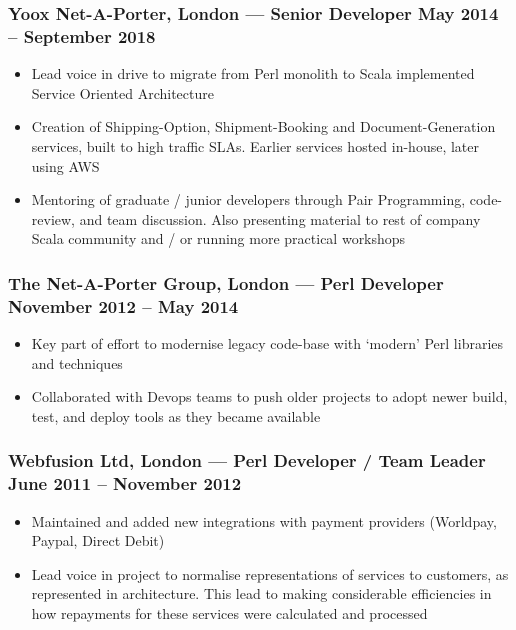 \documentclass[10pt, a4paper]{article}
\newcommand{\cvdate}[1]{{\small\mdseries\color{darkgray}#1}}
\providecommand{\tightlist}{%
  \setlength{\itemsep}{1pt}\setlength{\parskip}{0pt}}
\begin{document}
\subsubsection{\texorpdfstring{Yoox Net-A-Porter, London --- Senior
Developer
\hfill \cvdate{May 2014 – September 2018}}{Yoox Net-A-Porter, London --- Senior Developer }}\label{yoox-net-a-porter-london-senior-developer}

\begin{itemize}
\tightlist
\item
  Lead voice in drive to migrate from Perl monolith to Scala implemented
  Service Oriented Architecture
\item
  Creation of Shipping-Option, Shipment-Booking and Document-Generation
  services, built to high traffic SLAs. Earlier services hosted
  in-house, later using AWS
\item
  Mentoring of graduate / junior developers through Pair Programming,
  code-review, and team discussion. Also presenting material to rest of
  company Scala community and / or running more practical workshops
\end{itemize}

\subsubsection{\texorpdfstring{The Net-A-Porter Group, London --- Perl
Developer
\hfill \cvdate{November 2012 – May 2014}}{The Net-A-Porter Group, London --- Perl Developer }}\label{the-net-a-porter-group-london-perl-developer}

\begin{itemize}
\tightlist
\item
  Key part of effort to modernise legacy code-base with `modern' Perl
  libraries and techniques
\item
  Collaborated with Devops teams to push older projects to adopt newer
  build, test, and deploy tools as they became available
\end{itemize}

\subsubsection{\texorpdfstring{Webfusion Ltd, London --- Perl Developer
/ Team Leader
\hfill \cvdate{June 2011 – November 2012}}{Webfusion Ltd, London --- Perl Developer / Team Leader }}\label{webfusion-ltd-london-perl-developer-team-leader}

\begin{itemize}
\tightlist
\item
  Maintained and added new integrations with payment providers
  (Worldpay, Paypal, Direct Debit)
\item
  Lead voice in project to normalise representations of services to
  customers, as represented in architecture. This lead to making
  considerable efficiencies in how repayments for these services were
  calculated and processed
\end{itemize}
\end{document}
